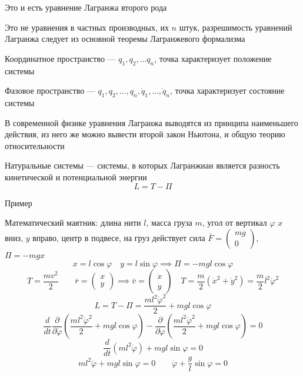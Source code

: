 \documentclass[crop=false]{standalone}
\begin{document}
Это и есть уравнение Лагранжа второго рода

Это не уравнения в частных производных, их $n$ штук, разрешимость уравнений Лагранжа следует из основной теоремы Лагранжевого формализма

\Def Координатное пространство — $q_1, q_2, \dots q_n$, точка характеризует положение системы

\Def Фазовое пространство — $q_1 , q_2, \dots, q_n , \dot q_1, \dots, \dot q_n$, точка характеризует состояние системы

В современной физике уравнения Лагранжа выводятся из принципа наименьшего действия, из него же можно вывести второй закон Ньютона, и общую теорию относительности

\Def Натуральные системы — системы, в которых Лагранжиан является разность кинетической и потенциальной энергии
\[L = T - \Pi\]

\keypoint Пример

Математический маятник: длина нити $l$, масса груза $m$, угол от вертикал $\varphi$
$x$ вниз, $y$ вправо, центр в подвесе, на груз действует сила $\bar F = \begin{pmatrix}
    mg \\ 0
\end{pmatrix}$, $\Pi = - mgx$
\[x = l \cos \varphi \quad y = l \sin \varphi \implies \Pi = - m g l \cos \varphi\]
\[T = \frac{m v^2}{2} \qquad \bar r = \begin{pmatrix}
    x \\ y
\end{pmatrix} \implies \bar v = \begin{pmatrix}
    \dot x \\ \dot y
\end{pmatrix} \quad T = \frac{m}{2} \left(\dot x^2 + \dot y^2\right) = \frac{m}{2} l^2 \dot \varphi^2\]
\[L = T - \Pi = \frac{m l^2 \dot \varphi^2}{2} + m g l \cos \varphi\]
\[\frac{d}{d t} \frac{\partial}{\partial \dot \varphi} \left(\frac{m l^2 \dot \varphi^2}{2} + m g l \cos \varphi\right) - \frac{\partial }{\partial \varphi} \left( \frac{m l^2 \dot \varphi^2}{2} + m g l \cos \varphi \right) = 0\]
\[\frac{d}{d t} (m l^2 \dot \varphi) + m g l \sin \varphi = 0\]
\[m l^2 \ddot \varphi + m g l \sin \varphi = 0 \qquad \ddot \varphi + \frac{g}{l} \sin \varphi = 0\]
\end{document}
